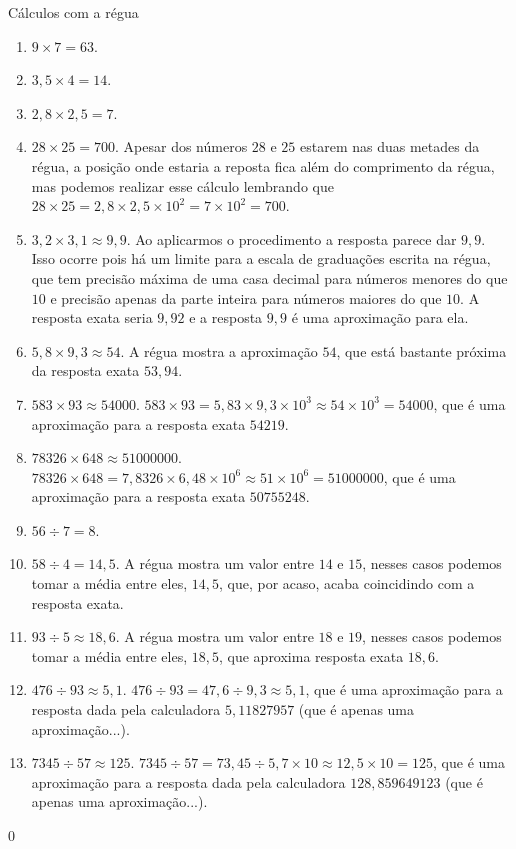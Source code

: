\begin{answer}{Cálculos com a régua}
{	\begin{enumerate}
	\item $9 \times 7 = 63$.
	\item $3{,}5 \times 4 = 14$.
	\item $2{,}8 \times 2,5 = 7$.
	\item $28 \times 25 = 700$. Apesar dos números $28$ e $25$ estarem nas duas metades da régua, a posição onde estaria a reposta fica além do comprimento da régua, mas podemos realizar esse cálculo lembrando que $28 \times 25 = 2{,}8 \times 2{,}5 \times 10^2 = 7 \times 10^2 = 700$.
	\item $3{,}2 \times 3{,}1 \approx 9{,}9$. Ao aplicarmos o procedimento a resposta parece dar $9,9$. Isso ocorre pois há um limite para a escala de graduações escrita na régua, que tem precisão máxima de uma casa decimal para números menores do que $10$ e precisão apenas da parte inteira para números maiores do que $10$. A resposta exata seria $9{,}92$ e a resposta $9{,}9$ é uma aproximação para ela.
	\item $5{,}8 \times 9{,}3 \approx 54$. A régua mostra a aproximação $54$, que está bastante próxima da resposta exata $53{,}94$.
	\item $583 \times 93\approx 54000$. $583 \times 93 = 5,83 \times 9,3 \times 10^3 \approx 54 \times 10^3 = 54000$, que é uma aproximação para a resposta exata $54219$.
	\item $78326 \times 648 \approx 51000000$. $78326 \times 648 = 7,8326 \times 6,48 \times 10^6 \approx 51 \times 10^6 = 51000000$, que é uma aproximação para a resposta exata $50755248$.
	\item $56 \div 7 = 8$.
	\item $58 \div 4 = 14{,}5$. A régua mostra um valor entre $14$ e $15$, nesses casos podemos tomar a média entre eles, $14{,}5$, que, por acaso, acaba coincidindo com a resposta exata.
	\item $93 \div 5 \approx 18{,}6$. A régua mostra um valor entre $18$ e $19$, nesses casos podemos tomar a média entre eles, $18{,}5$, que aproxima resposta exata $18{,}6$.
	\item $476 \div 93 \approx 5{,}1$. $476 \div 93 = 47{,}6 \div 9{,}3 \approx 5{,}1$, que é uma aproximação para a resposta dada pela calculadora $5{,}11827957$ (que é apenas uma aproximação...).
	\item $7345 \div 57 \approx 125$. $7345 \div 57 =73,45 \div 5{,}7 \times 10\approx 12{,}5 \times 10 = 125$, que é uma aproximação para a resposta dada pela calculadora $128{,}859649123$ (que é apenas uma aproximação...).
\end{enumerate}
}{0}
\end{answer}


